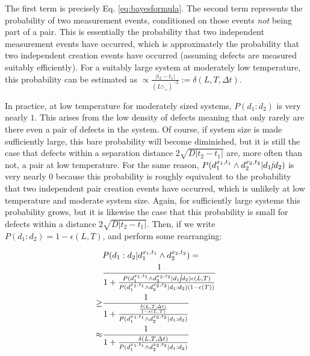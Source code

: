 \documentclass[twocolumn,superscriptaddress,aps,prb,floatfix]{revtex4-1}
\begin{document}
The first term is precisely Eq. \ref{eq:bayesformula}.  The second term represents the probability of two measurement events, conditioned on those events \emph{not} being part of a pair.  This is essentially the probability that two independent measurement events have occurred, which is approximately the probability that two independent creation events have occurred (assuming defects are measured suitably efficiently).  For a suitably large system at moderately low temperature, this probability can be estimated as $\propto \frac{|t_2-t_1|}{(L \gamma_+)^{-2}}:=\delta(L,T,\Delta t)$.

In practice, at low temperature for moderately sized systems, $P(d_1 : d_2)$ is very nearly $1$.  This arises from the low density of defects meaning that only rarely are there even a pair of defects in the system.  Of course, if system size is made sufficiently large, this bare probability will become diminished, but it is still the case that defects within a separation distance $2\sqrt{D |t_2 - t_1|}$ are, more often than not, a pair at low temperature.  For the same reason, $P(d_1^{x_1,t_1} \wedge d_2^{x_2,t_2} | d_1\cancel{:}d_2)$ is very nearly $0$ because this probability is roughly equivalent to the probability that two independent pair creation events have occurred, which is unlikely at low temperature and moderate system size.  Again, for sufficiently large systems this probability grows, but it is likewise the case that this probability is small for defects within a distance $2\sqrt{D |t_2 - t_1|}$.  Then, if we write $P(d_1 : d_2) = 1 - \epsilon(L,T)$, and perform some rearranging:

\begin{align}
\label{eq:bayes_simple}
&P(d_1:d_2 | d_1^{x_1,t_1} \wedge d_2^{x_2,t_2}) = \\ \notag
&\frac{1}{1+\frac{P(d_1^{x_1,t_1} \wedge d_2^{x_2,t_2} | d_1\cancel{:}d_2) \epsilon(L,T)}{P(d_1^{x_1,t_1} \wedge d_2^{x_2,t_2} | d_1:d_2) (1-\epsilon(T))}} \\ \notag
\geq &\frac{1}{1+\frac{\frac{\delta(L,T,\Delta t)}{1-\epsilon(L,T)}} {P(d_1^{x_1,t_1} \wedge d_2^{x_2,t_2} | d_1:d_2)}} \\ \notag
\approx &\frac{1}{1+\frac{\delta(L,T,\Delta t)}{P(d_1^{x_1,t_1} \wedge d_2^{x_2,t_2} | d_1:d_2)}}
\end{align}
\end{document}
